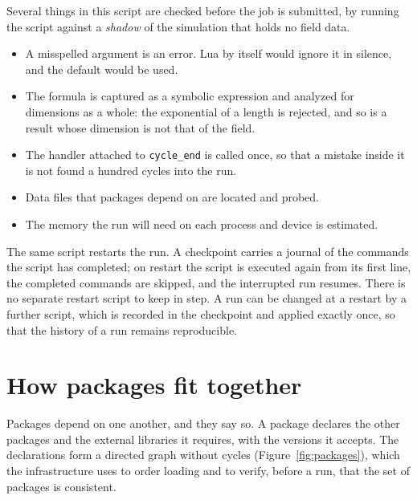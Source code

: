 \documentclass[11pt,a4paper]{article}
\newcommand{\code}[1]{\texttt{#1}}
\begin{document}
Several things in this script are checked before the job is submitted, by
running the script against a \emph{shadow} of the simulation that holds no
field data.

\begin{itemize}[itemsep=1pt]
  \item A misspelled argument is an error.  Lua by itself would ignore it
        in silence, and the default would be used.
  \item The formula is captured as a symbolic expression and analyzed for
        dimensions as a whole: the exponential of a length is rejected, and
        so is a result whose dimension is not that of the field.
  \item The handler attached to \code{cycle\_end} is called once, so that a
        mistake inside it is not found a hundred cycles into the run.
  \item Data files that packages depend on are located and probed.
  \item The memory the run will need on each process and device is
        estimated.
\end{itemize}

The same script restarts the run.  A checkpoint carries a journal of the
commands the script has completed; on restart the script is executed again
from its first line, the completed commands are skipped, and the
interrupted run resumes.  There is no separate restart script to keep in
step.  A run can be changed at a restart by a further script, which is
recorded in the checkpoint and applied exactly once, so that the history of
a run remains reproducible.

\section{How packages fit together}

Packages depend on one another, and they say so.  A package declares the
other packages and the external libraries it requires, with the versions it
accepts.  The declarations form a directed graph without cycles
(Figure~\ref{fig:packages}), which the infrastructure uses to order loading
and to verify, before a run, that the set of packages is consistent.
\end{document}
